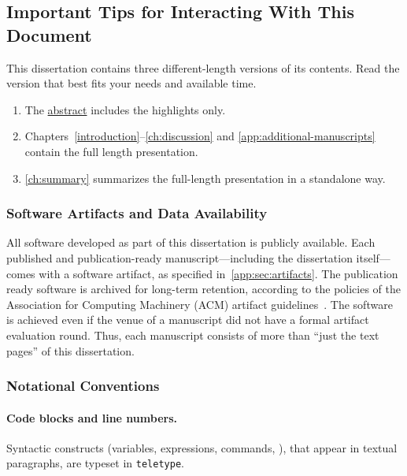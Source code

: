 \subsection{Important Tips for Interacting With This Document}
\label{subsec:tips}

This dissertation contains three different-length versions of its contents.
Read the version that best fits your needs and available time.

\begin{mdframed}[backgroundcolor=priorbase,linecolor=cc]
\begin{enumerate}[wide, labelwidth=!, labelindent=0pt]
\item The \hyperref[abs]{abstract} includes the highlights only.
\item Chapters~\ref{introduction}--\ref{ch:discussion} and \ref{app:additional-manuscripts} contain the full length presentation.
\item \autoref{ch:summary} summarizes the full-length presentation in a standalone way.
\end{enumerate}
\end{mdframed}

\subsubsection{Software Artifacts and Data Availability}

All software developed as part of this dissertation is publicly available.
Each published and publication-ready manuscript---including the dissertation itself---comes with a software artifact, as specified in~\autoref{app:sec:artifacts}.
The publication ready software is archived for long-term retention, according to the policies of the Association for Computing Machinery (ACM) artifact guidelines~\cite{acm_badging}.
The software is achieved even if the venue of a manuscript did not have a formal artifact evaluation round.
Thus, each manuscript consists of more than \enquote{just the text pages} of this dissertation.

\subsubsection{Notational Conventions}

\paragraph*{Code blocks and line numbers.}
Syntactic constructs (variables, expressions, commands, \etc), that appear in textual paragraphs, are typeset in \texttt{teletype}.

